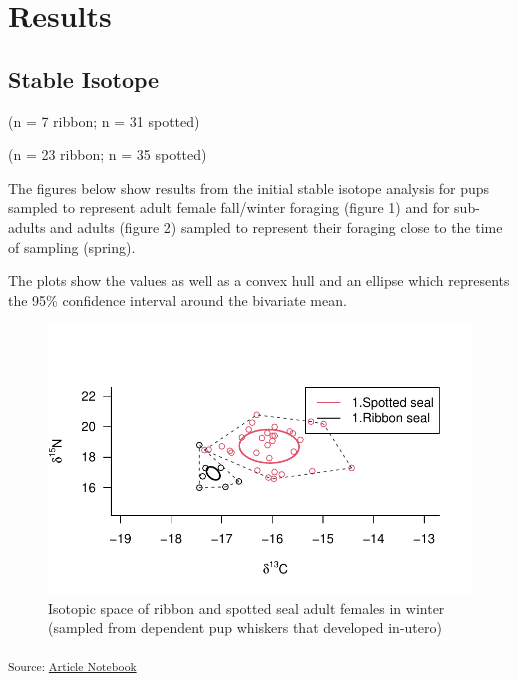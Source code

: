 \documentclass[
  letterpaper,
  DIV=11,
  numbers=noendperiod]{scrartcl}
\begin{document}
\section{Results}\label{results}

\subsection{Stable Isotope}\label{stable-isotope}

(n = 7 ribbon; n = 31 spotted)

(n = 23 ribbon; n = 35 spotted)

The figures below show results from the initial stable isotope analysis
for pups sampled to represent adult female fall/winter foraging (figure
1) and for sub-adults and adults (figure 2) sampled to represent their
foraging close to the time of sampling (spring).

The plots show the values as well as a convex hull and an ellipse which
represents the 95\% confidence interval around the bivariate mean.

\begin{figure}[H]

{\centering \includegraphics{index_files/figure-pdf/unnamed-chunk-15-1.pdf}

}

\caption{Isotopic space of ribbon and spotted seal adult females in
winter (sampled from dependent pup whiskers that developed in-utero)}

\end{figure}%

\textsubscript{Source:
\href{https://noaa-afsc.github.io/ribbon-spotted-niche-partition/index.qmd.html}{Article
Notebook}}
\end{document}
